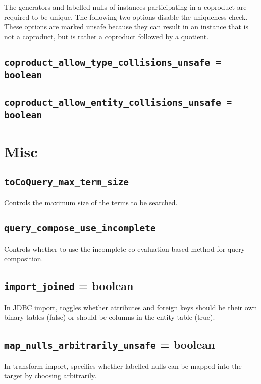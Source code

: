 \documentclass[10pt]{book}
\begin{document}
The generators and labelled nulls of instances participating in a coproduct are required to be unique.  The following two options disable the uniqueness check.  These options are marked unsafe because they can result in an instance that is not a coproduct, but is rather a coproduct followed by a quotient.

\subsection{{\tt coproduct\_allow\_type\_collisions\_unsafe = boolean}}

\subsection{{\tt coproduct\_allow\_entity\_collisions\_unsafe = boolean}}

\section{Misc}

\subsection{{\tt toCoQuery\_max\_term\_size}}

Controls the maximum size of the terms to be searched. 

\subsection{{\tt query\_compose\_use\_incomplete}}

Controls whether to use the incomplete co-evaluation based method for query composition.

\subsection{{\tt import\_joined} = boolean} 

In JDBC import, toggles whether attributes and foreign keys should be their own binary tables (false) or should be columns in the entity table (true).

\subsection{{\tt map\_nulls\_arbitrarily\_unsafe} = boolean}

In transform import, specifies whether labelled nulls can be mapped into the target by choosing arbitrarily.
\end{document}
